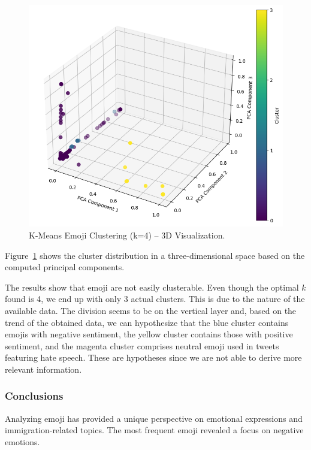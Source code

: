 \begin{figure}
    \includegraphics[width=\columnwidth]{../../results/images/emoji_cluster.png}
    \caption{K-Means Emoji Clustering (k=4) – 3D Visualization.}
    \label{fig:3d_clustering}
\end{figure}

Figure~\ref{fig:3d_clustering} shows the cluster distribution in a three-dimensional space based on the computed principal components.

The results show that emoji are not easily clusterable. Even though the optimal \( k \) found is 4, we end up with only 3 actual clusters. This is due to the nature of the available data. The division seems to be on the vertical layer and, based on the trend of the obtained data, we can hypothesize that the blue cluster contains emojis with negative sentiment, the yellow cluster contains those with positive sentiment, and the magenta cluster comprises neutral emoji used in tweets featuring hate speech. These are hypotheses since we are not able to derive more relevant information.

\subsubsection{Conclusions}
Analyzing emoji has provided a unique perspective on emotional expressions and immigration-related topics. The most frequent emoji revealed a focus on negative emotions.

